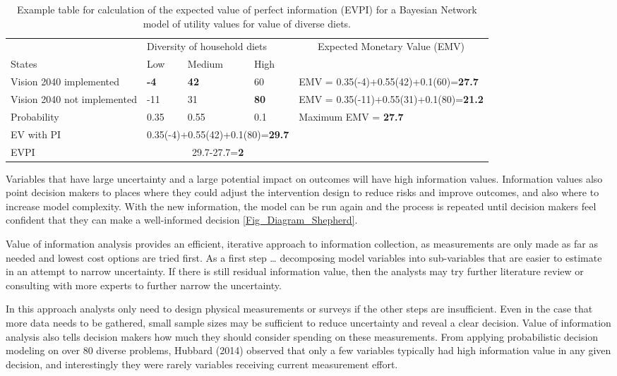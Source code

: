 \documentclass[
]{article}
\begin{document}
\begin{table}[]
\centering
\caption{Example table for calculation of the expected value of perfect information (EVPI) for a Bayesian Network model of utility values for value of diverse diets.}
\label{Table_EVPI_calc}
\begin{tabular}{lllll}
\hline
 & \multicolumn{3}{l}{Diversity of household diets} & \multicolumn{1}{c}{\multirow{2}{*}{Expected Monetary Value (EMV)}} \\ \cline{1-4}
States & Low & Medium & High & \multicolumn{1}{c}{} \\ \cline{5-5} 
Vision 2040 implemented & \textbf{-4} & \textbf{42} & 60 & EMV = 0.35(-4)+0.55(42)+0.1(60)=\textbf{27.7} \\
Vision 2040 not implemented & -11 & 31 & \textbf{80} & EMV = 0.35(-11)+0.55(31)+0.1(80)=\textbf{21.2} \\
Probability & 0.35 & 0.55 & 0.1 & Maximum EMV = \textbf{27.7} \\
EV with PI & \multicolumn{3}{c}{0.35(-4)+0.55(42)+0.1(80)=\textbf{29.7}} &  \\
EVPI & \multicolumn{3}{c}{29.7-27.7=\textbf{2}} &  \\ \hline
\end{tabular}
\end{table}

Variables that have large uncertainty and a large potential impact on
outcomes will have high information values. Information values also
point decision makers to places where they could adjust the intervention
design to reduce risks and improve outcomes, and also where to increase
model complexity. With the new information, the model can be run again
and the process is repeated until decision makers feel confident that
they can make a well-informed decision \autoref{Fig_Diagram_Shepherd}.

Value of information analysis provides an efficient, iterative approach
to information collection, as measurements are only made as far as
needed and lowest cost options are tried first. As a first step \ldots{}
decomposing model variables into sub-variables that are easier to
estimate in an attempt to narrow uncertainty. If there is still residual
information value, then the analysts may try further literature review
or consulting with more experts to further narrow the uncertainty.

In this approach analysts only need to design physical measurements or
surveys if the other steps are insufficient. Even in the case that more
data needs to be gathered, small sample sizes may be sufficient to
reduce uncertainty and reveal a clear decision. Value of information
analysis also tells decision makers how much they should consider
spending on these measurements. From applying probabilistic decision
modeling on over 80 diverse problems, Hubbard (2014) observed that only
a few variables typically had high information value in any given
decision, and interestingly they were rarely variables receiving current
measurement effort.
\end{document}

